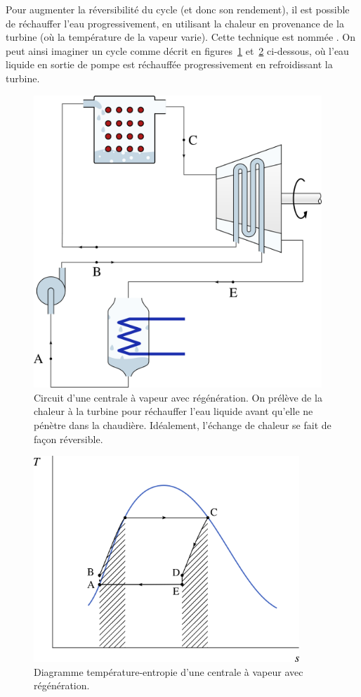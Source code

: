 		Pour augmenter la réversibilité du cycle (et donc son rendement), il est possible de réchauffer l’eau progressivement, en utilisant la chaleur en provenance de la turbine (où la température de la vapeur varie). Cette technique est nommée . On peut ainsi imaginer un cycle comme décrit en figures~\ref{fig_circuit_regeneration} et~\ref{fig_ts_lv_regeneration} ci-dessous, où l’eau liquide en sortie de pompe est réchauffée progressivement en refroidissant la turbine.

		\begin{figure}
			\begin{center}
				\includegraphics[height=11cm]{images/circuit_regeneration.png}
			\end{center}
			\caption{Circuit d’une centrale à vapeur avec régénération. On prélève de la chaleur à la turbine pour réchauffer l’eau liquide avant qu’elle ne pénètre dans la chaudière. Idéalement, l’échange de chaleur se fait de façon réversible.}
			\label{fig_circuit_regeneration}
		\end{figure}

		\begin{figure}
			\begin{center}
				\includegraphics[width=10cm]{images/ts_lv_regeneration.png}
			\end{center}
			\caption{Diagramme température-entropie d’une centrale à vapeur avec régénération.}
			\label{fig_ts_lv_regeneration}
		\end{figure}


